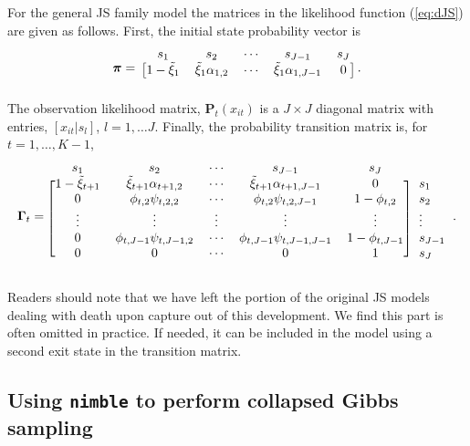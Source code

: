 \documentclass[12pt]{article}
\newcommand{\bpi}{\ensuremath{\boldsymbol{\pi}}}
\newcommand{\bG}{\ensuremath{\boldsymbol{\Gamma}}}
\begin{document}
For the general JS family model the matrices in the likelihood function (\ref{eq:dJS}) are given as follows. First, the initial state probability vector is 
%
\[
\bpi = \begin{blockarray}{cccccc} 
s_1 & s_2 & \cdots & s_{J-1} & s_J \\
\begin{block}{[cccccc]}
1-\tilde{\xi}_1 & \tilde{\xi}_1\alpha_{1,2} & \cdots & \tilde{\xi}_1\alpha_{1,J-1} & 0 \\
\end{block}
\end{blockarray}.
\]
% 
The observation likelihood matrix, $\mathbf{P}_t(x_{it})$ is a $J\times J$ diagonal matrix with entries, $[x_{it} | s_l]$, $l=1,\dots J$.  Finally, the probability transition matrix is, for $t=1,\dots,K-1$,
%
\begin{equation}
\label{eq.gamma.mat}
\bG_t = \begin{blockarray}{cccccc} 
s_1 & s_2 & \cdots & s_{J-1} & s_J \\
\begin{block}{[ccccc]l}
1-\tilde{\xi}_{t+1} & \tilde{\xi}_{t+1}\alpha_{t+1,2} & \cdots & \tilde{\xi}_{t+1}\alpha_{t+1,J-1} & 0 & s_1\\
0 & \phi_{t,2} \psi_{t,2,2} & \cdots & \phi_{t,2} \psi_{t,2,J-1} & 1-\phi_{t,2} & s_2\\
\vdots &  \vdots & \vdots &\vdots & \vdots & \vdots \\
0 & \phi_{t,J-1} \psi_{t,J-1,2} & \cdots & \phi_{t,J-1} \psi_{t,J-1,J-1} & 1-\phi_{t,J-1} & s_{J-1}\\
0 & 0 & \cdots & 0 & 1 & s_J\\
\end{block}
\end{blockarray}.
\end{equation}
%

Readers should note that we have left the portion of the original JS models dealing with death upon capture out of this development. We find this part is often omitted in practice. If needed, it can be included in the model using a second exit state in the transition matrix.  


\subsection{Using {\tt nimble} to perform collapsed Gibbs sampling}
\end{document}
